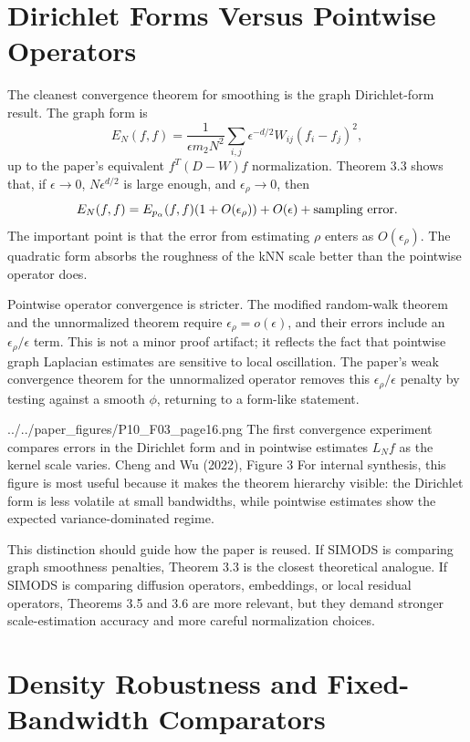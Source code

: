 \documentclass[11pt]{article}
\begin{document}
\section{Dirichlet Forms Versus Pointwise Operators}

The cleanest convergence theorem for smoothing is the graph Dirichlet-form
result. The graph form is
\[
  E_N(f,f)
  =
  \frac{1}{\epsilon m_2 N^2}
  \sum_{i,j}
  \epsilon^{-d/2}W_{ij}(f_i-f_j)^2,
\]
up to the paper's equivalent \(f^T(D-W)f\) normalization. Theorem 3.3 shows
that, if \(\epsilon\to 0\), \(N\epsilon^{d/2}\) is large enough, and
\(\epsilon_\rho\to 0\), then
\[
  E_N(f,f)
  =
  E_{p_\alpha}(f,f)(1+O(\epsilon_\rho))
  +O(\epsilon)
  +\hbox{sampling error}.
\]
The important point is that the error from estimating \(\rho\) enters as
\(O(\epsilon_\rho)\). The quadratic form absorbs the roughness of the kNN
scale better than the pointwise operator does.

Pointwise operator convergence is stricter. The modified random-walk theorem
and the unnormalized theorem require \(\epsilon_\rho=o(\epsilon)\), and their
errors include an \(\epsilon_\rho/\epsilon\) term. This is not a minor proof
artifact; it reflects the fact that pointwise graph Laplacian estimates are
sensitive to local oscillation. The paper's weak convergence theorem for the
unnormalized operator removes this \(\epsilon_\rho/\epsilon\) penalty by
testing against a smooth \(\phi\), returning to a form-like statement.

\paperfigure
  {../../paper_figures/P10_F03_page16.png}
  {The first convergence experiment compares errors in the Dirichlet form and
  in pointwise estimates \(L_Nf\) as the kernel scale varies.}
  {Cheng and Wu (2022), Figure 3}
  {For internal synthesis, this figure is most useful because it makes the
  theorem hierarchy visible: the Dirichlet form is less volatile at small
  bandwidths, while pointwise estimates show the expected variance-dominated
  regime.}

This distinction should guide how the paper is reused. If SIMODS is comparing
graph smoothness penalties, Theorem 3.3 is the closest theoretical analogue.
If SIMODS is comparing diffusion operators, embeddings, or local residual
operators, Theorems 3.5 and 3.6 are more relevant, but they demand stronger
scale-estimation accuracy and more careful normalization choices.

\section{Density Robustness and Fixed-Bandwidth Comparators}
\end{document}
